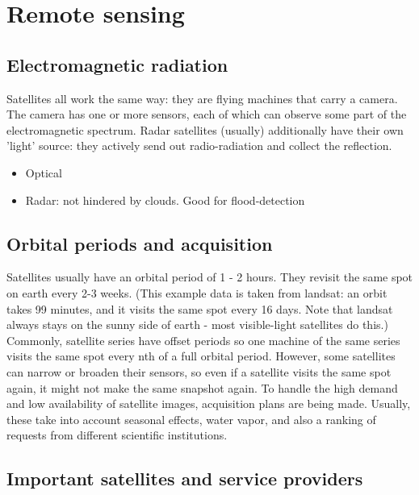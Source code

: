 \section{Remote sensing}


\subsection{Electromagnetic radiation}
Satellites all work the same way: they are flying machines that carry a camera. The camera has one or more sensors, each of which can observe some part of the electromagnetic spectrum.
Radar satellites (usually) additionally have their own 'light' source: they actively send out radio-radiation and collect the reflection.

\begin{itemize}
    \item Optical
    \item Radar: not hindered by clouds. Good for flood-detection
\end{itemize}





\subsection{Orbital periods and acquisition}
Satellites usually have an orbital period of 1 - 2 hours. They revisit the same spot on earth every 2-3 weeks.
(This example data is taken from landsat: an orbit takes 99 minutes, and it visits the same spot every 16 days.
Note that landsat always stays on the sunny side of earth - most visible-light satellites do this.)
Commonly, satellite series have offset periods so one machine of the same series
visits the same spot every nth of a full orbital period.
However, some satellites can narrow or broaden their sensors, so even if
a satellite visits the same spot again, it might not make the same snapshot again.
To handle the high demand and low availability of satellite images, acquisition plans are being made.
Usually, these take into account seasonal effects,
water vapor, and also a ranking of requests from different scientific institutions.








\subsection{Important satellites and service providers}


